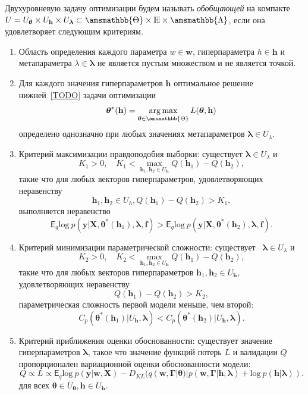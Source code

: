 \begin{defin}
Двухуровневую задачу оптимизации будем называть \textit{обобщающей} на компакте $U = U_{\boldsymbol{\theta}} \times U_{\mathbf{h}} \times U_{\boldsymbol{\lambda}} \subset \amsmathbb{\Theta} \times \mathbb{H} \times \amsmathbb{\Lambda}$, если она удовлетворяет следующим критериям.
\begin{enumerate}
\item Область определения каждого параметра $w \in \mathbf{w}$, гиперпараметра $h \in \mathbf{h}$ и метапараметра $\lambda \in \boldsymbol{\lambda}$ не  является пустым множеством и не является точкой.
\item Для каждого значения гиперпараметров $\mathbf{h}$ оптимальное решение нижней~\eqref{TODO} задачи оптимизации 
\[
\boldsymbol{\theta}^{*}(\mathbf{h}) = \argmax_{\boldsymbol{\theta} \in \amsmathbb{\Theta}} L(\boldsymbol{\theta}, \mathbf{h})
\]
определено однозначно при любых значениях метапараметров $\boldsymbol{\lambda} \in U_{\lambda}$.

\item Критерий максимизации правдоподобия выборки: существует $\boldsymbol{\lambda} \in U_{\lambda}$ и  $$K_1>0, \quad K_1 < \max_{\mathbf{h}_1, \mathbf{h}_2 \in U_\mathbf{h}} Q(\mathbf{h}_1) - Q(\mathbf{h}_2),$$ такие что для любых векторов гиперпараметров, удовлетворяющих неравенству $$\mathbf{h}_1, \mathbf{h}_2 \in U_{h}, Q(\mathbf{h}_1)-Q(\mathbf{h}_2) > K_1,$$ выполняется неравенство $$\mathsf{E}_q \text{log}~p(\mathbf{y}|\mathbf{X}, \boldsymbol{\theta}^{*}(\mathbf{h}_1), \boldsymbol{\lambda}, \mathbf{f})>\mathsf{E}_q \text{log}~p(\mathbf{y}|\mathbf{X}, \boldsymbol{\theta}^{*}(\mathbf{h}_2), \boldsymbol{\lambda}, \mathbf{f}).$$

\item Критерий минимизации параметрической сложности:  существует  $\boldsymbol{\lambda} \in U_{\lambda}$ и $$K_2>0, \quad K_2 < \max_{\mathbf{h}_1, \mathbf{h}_2 \in U_\mathbf{h}} Q(\mathbf{h}_1) - Q(\mathbf{h}_2),$$  такие что для любых векторов гиперпараметров $\mathbf{h}_1, \mathbf{h}_2 \in U_\mathbf{h}$, удовлетворяющих неравенству $$Q(\mathbf{h}_1)-Q(\mathbf{h}_2) > K_2,$$ параметрическая сложность первой модели меньше, чем второй: $$C_p(\boldsymbol{\theta}^{*}(\mathbf{h}_1)|U_\mathbf{h},\boldsymbol{\lambda})<C_p(\boldsymbol{\theta}^{*}(\mathbf{h}_2)|U_\mathbf{h},\boldsymbol{\lambda}).$$

\item Критерий приближения оценки обоснованности: существует значение гиперпараметров $\boldsymbol{\lambda}$, такое что значение функций потерь $L$ и валидации $Q$ пропорционален вариационной оценки обоснованности модели: $$Q \propto  L \propto 
\mathsf{E}_q \text{log}~p(\mathbf{y}|\mathbf{w}, \mathbf{X})-{D}_{KL}(q(\mathbf{w}, \boldsymbol{\Gamma}|\boldsymbol{\theta})|p(\mathbf{w}, \boldsymbol{\Gamma}|\mathbf{h}, \boldsymbol{\lambda}) + \text{log}~p(\mathbf{h}|\boldsymbol{\lambda})).
$$ для всех $\boldsymbol{\theta}\in U_{\boldsymbol{\theta}}, \mathbf{h} \in U_{\mathbf{h}}.$ 


\end{enumerate}
\end{defin}

